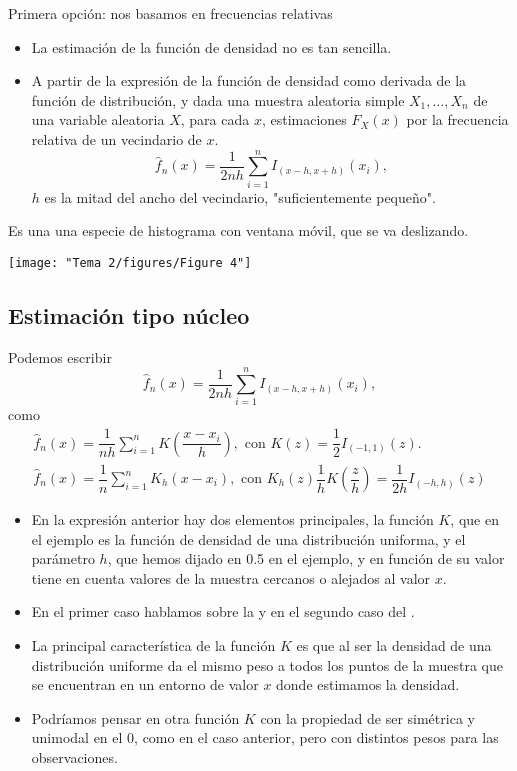 Primera opción: nos basamos en frecuencias relativas
\begin{itemize}[label=\textbullet]
    \item La estimación de la función de densidad no es tan sencilla.
    \item A partir de la expresión de la función de densidad como derivada de la función de distribución, y dada una muestra aleatoria simple $X_1,\dots,X_n$ de una variable aleatoria $X$, para cada $x$, estimaciones $F_X(x)$ por la frecuencia relativa de un vecindario de  $x$.
         \[
        \hat{f}_n(x)=\dfrac{1}{2nh}\sum_{i=1}^{n} I_{(x-h,x+h)}(x_i),
        \] $h$ es la mitad del ancho del vecindario, "suficientemente pequeño".
\end{itemize}
        Es una una especie de histograma con ventana móvil, que se va deslizando.
        \begin{center}
            \texttt{[image: "Tema 2/figures/Figure 4"]}
        \end{center}
\subsection{Estimación tipo núcleo}
Podemos escribir \[
\hat{f}_n(x)=\dfrac{1}{2nh}\sum_{i=1}^{n} I_{(x-h,x+h)}(x_{i}),
\] como \[
\begin{array}{c}
\hat{f}_n(x)=\dfrac{1}{nh}\sum_{i=1}^{n} K\left( \dfrac{x-x_i}{h} \right) ,\text{ con }K(z)=\dfrac{1}{2}I_{(-1,1)}(z).\\
\hat{f}_n(x)=\dfrac{1}{n}\sum_{i=1}^{n} K_h(x-x_i),\text{ con } K_h(z)\dfrac{1}{h}K\left( \dfrac{z}{h} \right) =\dfrac{1}{2h}I_{(-h,h)}(z)
\end{array}
\] 
\begin{itemize}[label=\textbullet]
    \item En la expresión anterior hay dos elementos principales, la función $K$, que en el ejemplo es la función de densidad de una distribución uniforma, y el parámetro $h$, que hemos dijado en 0.5 en el ejemplo, y en función de su valor tiene en cuenta valores de la muestra cercanos o alejados al valor $x$.

    \item En el primer caso hablamos sobre la    y en el segundo caso del  .
    \item La principal característica de la función $K$ es que al ser la densidad de una distribución uniforme da el mismo peso a todos los puntos de la muestra que se encuentran en un entorno de valor $x$ donde estimamos la densidad.
    \item Podríamos pensar en otra función $K$ con la propiedad de ser simétrica y unimodal en el 0, como en el caso anterior, pero con distintos pesos para las observaciones.
\end{itemize}
